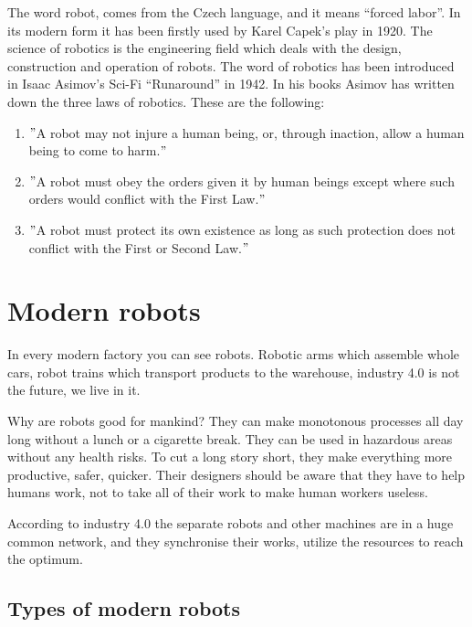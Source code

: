 		The word robot, comes from the Czech language, and it means “forced labor”. In its modern form it has been firstly used by Karel Capek’s play in 1920. The science of robotics is the engineering field which deals with the design, construction and operation of robots. The word of robotics has been introduced in Isaac Asimov’s Sci-Fi “Runaround” in 1942. In his books Asimov has written down the three laws of robotics. These are the following: \cite{robotics1}

		\begin{enumerate}
			\item $"$A robot may not injure a human being, or, through inaction, allow a human being to come to harm.$"$ \\
			\item $"$A robot must obey the orders given it by human beings except where such orders would conflict with the First Law.$"$ \\
			\item $"$A robot must protect its own existence as long as such protection does not conflict with the First or Second Law.$"$ \\
		\end{enumerate} 

	\section{Modern robots}

		\hspace{15pt}In every modern factory you can see robots. Robotic arms which assemble whole cars, robot trains which transport products to the warehouse, industry 4.0 is not the future, we live in it. 

		Why are robots good for mankind? They can make monotonous processes all day long without a lunch or a cigarette break. They can be used in hazardous areas without any health risks. To cut a long story short, they make everything more productive, safer, quicker. Their designers should be aware that they have to help humans work, not to take all of their work to make human workers useless.

		According to industry 4.0 the separate robots and other machines are in a huge common network, and they synchronise their works, utilize the resources to reach the optimum. \cite{robotics2}

		\subsection{Types of modern robots}

